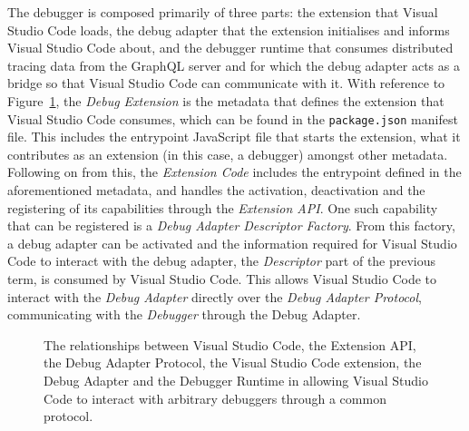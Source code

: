 \documentclass[12pt,pdftex,titlepage]{report}
\begin{document}
                The debugger is composed primarily of three parts: the extension that Visual Studio Code loads, the debug adapter that the extension initialises and informs Visual Studio Code about, and the debugger runtime
                that consumes distributed tracing data from the GraphQL server and for which the debug adapter acts as a bridge so that Visual Studio Code can communicate with it. With reference to Figure~\ref{fig:vscodedebug},
                the \textit{Debug Extension} is the metadata that defines the extension that Visual Studio Code consumes, which can be found in the \texttt{package.json} manifest file. This includes the entrypoint JavaScript file 
                that starts the extension, what it contributes as an extension (in this case, a debugger) amongst other metadata. Following on from this, the \textit{Extension Code} includes the entrypoint defined in the 
                aforementioned metadata, and handles the activation, deactivation and the registering of its capabilities through the \textit{Extension API}. One such capability that can be registered is a \textit{Debug Adapter 
                Descriptor Factory}. From this factory, a debug adapter can be activated and the information required for Visual Studio Code to interact with the debug adapter, the \textit{Descriptor} part of the previous term, 
                is consumed by Visual Studio Code. This allows Visual Studio Code to interact with the \textit{Debug Adapter} directly over the \textit{Debug Adapter Protocol}, communicating with the \textit{Debugger} through the 
                Debug Adapter.

                \begin{figure}[hbt!]
                    \centering
                        \caption{The relationships between Visual Studio Code, the Extension API, the Debug Adapter Protocol, the Visual Studio Code extension, the Debug Adapter and the Debugger Runtime in allowing
                        Visual Studio Code to interact with arbitrary debuggers through a common protocol.}
                        \label{fig:vscodedebug}
                    \end{figure}
\end{document}
